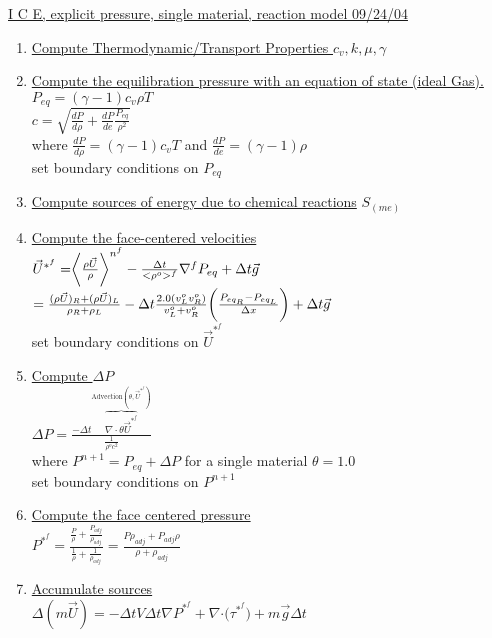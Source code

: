 \documentclass[fleqn]{article}
\newcommand{\bigS}[1]   {\ensuremath{S_{#1}}  }
\newcommand{\B}[1]      {\biggr{#1}}
\newcommand{\U}         {{\vec{U}}}
\newcommand{\rhoM}      {\ensuremath{\rho^{o}}}
\newcommand{\delt}      {\ensuremath{\Delta{t}} }
\newcommand{\sv}[1]     {\ensuremath{v^o_{{#1}} }}
\begin{document}
\setlength{\abovedisplayskip}{0.1in}
\setlength{\mathindent}{0.0in}
\underline{ I C E, explicit pressure, single material, reaction model  \hspace{ 0.5in}09/24/04}

\begin{enumerate}
\item \underline{Compute Thermodynamic/Transport Properties
$c_v, k, \mu, \gamma$}
\item \underline{Compute the equilibration pressure with an equation of state (ideal Gas).}\\
$P_{eq} = (\gamma -1) c_v \rho T$\\
$c = \sqrt{ \frac{dP}{d\rho} + \frac{dP}{de} \frac{P_{eq}}{\rho^2} }$\\
where
$\frac{dP}{d\rho} = (\gamma -1) c_v T$ and 
$\frac{dP}{de} = (\gamma - 1) \rho$ \\
set boundary conditions on $P_{eq}$
\item \underline{Compute sources of energy due to chemical reactions} 
$\bigS{(m e)}$
\item \underline{Compute the face-centered velocities}\\
  $ \vec{U}^{*^{f}} 
    = \B{<} \frac{ \rho \U }{\rho} \B{>}^{n^{f}}
    - \frac{ \delt }{< \rhoM >^f} \nabla^{f} P_{eq}
     + \delt\vec{g} $ \\
$    
   =\frac{(\rho \U)_{R} + (\rho \U)_{L}}{\rho_{R} + \rho_{L}}
   -\delt \frac{2.0 (\sv{L} \sv{R})}  {\sv{L} + \sv{R}}  \B{(} \frac{P_{eq_R} - P_{eq_L}}{\Delta x}\B{)}
   + \delt\vec{g} $ \\
set boundary conditions on $\vec{U}^{*^{f}}$
%
\item \underline{Compute $\Delta P$}  \\
$     \Delta P =  
              \frac{  - \Delta{t} \overbrace{ \nabla \cdot \theta \vec{U}^{*^{f}} } ^{\text{Advection}(\theta, \vec{U}^{*^{f}}) } }
              {\frac{1} {\rhoM c^2}} $\\
where $P^{n+1} = P_{eq} + \Delta{P}$ for a single material $\theta = 1.0$ \\
set boundary conditions on $P^{n+1}$
%
\item \underline{Compute the face centered pressure}\\
$ P^{*^{f}} = \frac{\frac{P}{\rho} + \frac{P_{adj}}{\rho_{adj}}}
                     {\frac{1}{\rho} + \frac{1}{\rho_{adj}}}
              =\frac{ {P \rho_{adj}} + {P_{adj} \rho }  }
                 { {\rho} + {\rho_{adj}  }  } $
%
\item \underline{Accumulate sources}\\  
 $\Delta(m\vec{U}) = 
    - \delt V \delt \nabla{ P^{*^f}} 
    + \nabla{ \cdot (\tau^{*^f}})
    + m \vec{g}\delt$
    

\end{enumerate}
\end{document}
